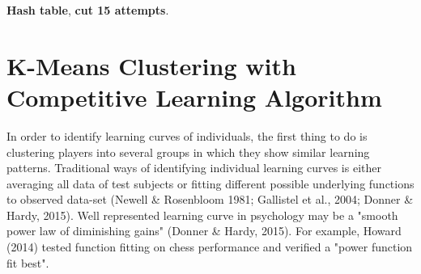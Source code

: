 \documentclass[12pt,a4paper]{report}
\begin{document}
\begin{comment}
(Python 2001)
There are various file formats which can provide a high level of data compression.

, which is formed from 15 factors, into the data vector having like hash table

By default, the pickle data format uses a relatively compact binary representation. If you need optimal size characteristics, you can efficiently compress pickled data.


•CSV is human readable and easy to edit manually
•CSV is simple to implement and parse
•CSV is processed by almost all existing applications
•CSV provides a straightforward information schema 
•CSV is faster to handle
•CSV is smaller in size
•CSV is considered to be standard format
•CSV is compact. For XML you start tag and end tag for each column in each row. In CSV you write the column headers only once.
•CSV is easy to generate

Since, depending on your computer setup you might not be able to fit it all in memory, we'll load each class into a separate data-set, store them on disk and curate them independently. Later we'll merge them into a single data-set of manageable size.
\end{comment}


\textbf{Hash table}, %
\textbf{cut 15 attempts}.

\section{K-Means Clustering with Competitive Learning Algorithm}

In order to identify learning curves of individuals, the first thing to do is clustering players into several groups in which they show similar learning patterns. Traditional ways of identifying individual learning curves is either averaging all data of test subjects 
or fitting different possible underlying functions to observed data-set (Newell \& Rosenbloom 1981; Gallistel et al., 2004; Donner \& Hardy, 2015). Well represented learning curve 
in psychology may be a "smooth power law of diminishing gains" (Donner \& Hardy, 2015). For example, Howard (2014) tested function fitting on chess performance and verified a "power function fit best". 
\end{document}
